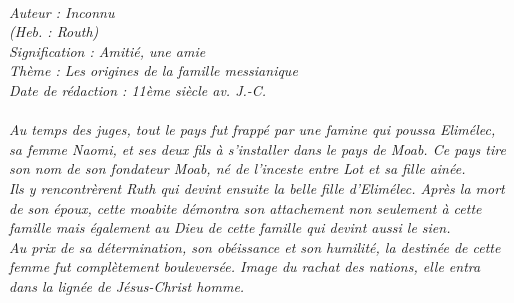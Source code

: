 \BFont
\noindent\hrulefill
{\footnotesize
\textit{
\bigskip
{\centering{}
\\Auteur : Inconnu
\\(Heb. : Routh)
\\Signification : Amitié, une amie
\\Thème : Les origines de la famille messianique
\\Date de rédaction : 11ème siècle av. J.-C.\\}
}
\textit{
\\Au temps des juges, tout le pays fut frappé par une famine qui poussa Elimélec, sa femme Naomi, et ses deux fils à s’installer dans le pays de Moab. Ce pays tire son nom de son fondateur Moab, né de l’inceste entre Lot et sa fille ainée.
\\Ils y rencontrèrent Ruth qui devint ensuite la belle fille d’Elimélec. Après la mort de son époux, cette moabite démontra  son attachement non seulement à cette famille mais également au Dieu de cette famille qui devint aussi le sien.
\\Au prix de sa détermination, son obéissance et son humilité, la destinée de cette femme fut complètement bouleversée. Image du rachat des nations, elle entra dans la lignée de Jésus-Christ homme.\bigskip
}
}
\par\nobreak\noindent\hrulefill
